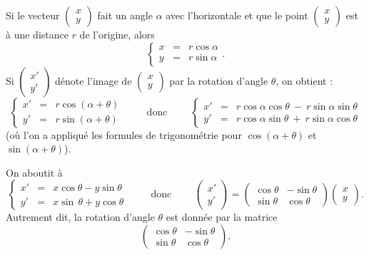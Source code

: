 \documentclass[class=report,crop=false]{standalone}
\begin{document}


Si le vecteur $\left(\begin{smallmatrix}x \\ y \end{smallmatrix}\right)$ fait un angle $\alpha$
avec l'horizontale et que le point $\left(\begin{smallmatrix}x \\ y \end{smallmatrix}\right)$
est à une distance $r$ de l'origine, alors
$$\left\{\begin{array}{rcl}
x & = & r \cos \alpha\\
y & = & r \sin \alpha
\end{array}.\right. $$
Si $\left(\begin{smallmatrix}x' \\ y' \end{smallmatrix}\right)$ dénote l'image
de $\left(\begin{smallmatrix}x \\ y \end{smallmatrix}\right)$ par la rotation d'angle
$\theta$, on obtient :
$$\left\{\begin{array}{rcl}
x' & = & r \cos (\alpha + \theta)\\
y' & = & r \sin (\alpha + \theta)
\end{array}\right.
\qquad \text{ donc } \qquad
\left\{\begin{array}{rcl}
x' & = & r \cos\alpha\cos\theta \  - \ r \sin \alpha \sin  \theta\\
y' & = & r \cos \alpha\sin\theta \ + \ r\sin \alpha \cos \theta
\end{array}\right.  $$
(où l'on a appliqué les formules de trigonométrie pour
$\cos (\alpha + \theta)$ et $\sin (\alpha + \theta)$).

On aboutit à
$$\left\{\begin{array}{rcl}
x' & = & x \cos  \theta - y \sin\theta\\
y' & = & x\sin \, \theta + y \cos\theta
\end{array}\right.
\qquad \text{ donc }\qquad
\begin{pmatrix}x' \\ y' \end{pmatrix}
= \begin{pmatrix}
\cos\theta & -\sin\theta\\
\sin\theta & \cos\theta
\end{pmatrix}
\begin{pmatrix}x \\ y \end{pmatrix}.
$$
Autrement dit, la rotation d'angle $\theta$ est donnée par la matrice
$$\begin{pmatrix}
\cos\theta & -\sin\theta\\
\sin\theta & \cos\theta
\end{pmatrix}.$$
\end{document}

